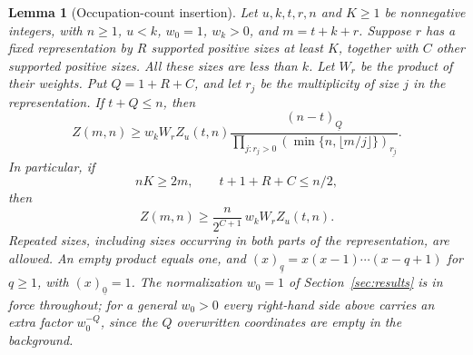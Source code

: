 \documentclass[11pt]{amsart}
\newtheorem{lemma}[theorem]{Lemma}
\theoremstyle{remark}\newtheorem{remark}[theorem]{Remark}
\newcommand{\fall}[2]{(#1)_{\underline{#2}}}
\begin{document}
\begin{lemma}[Occupation-count insertion]\label{lem:insertion}
Let $u,k,t,r,n$ and $K\ge1$ be nonnegative integers, with $n\ge1$, $u<k$,
$w_0=1$, $w_k>0$, and $m=t+k+r$. Suppose $r$ has a fixed representation
by $R$ supported positive sizes at least $K$, together with $C$ other
supported positive sizes. All these sizes are less than $k$. Let $W_r$ be
the product of their weights. Put $Q=1+R+C$, and let $r_j$ be the
multiplicity of size $j$ in the representation. If $t+Q\le n$, then
\begin{equation}\label{eq:sharpinsertion}
 Z(m,n)\ge w_kW_r Z_u(t,n)
 \frac{\fall{n-t}{Q}}
 {\displaystyle\prod_{j:r_j>0}\fall{\min\{n,\lfloor m/j\rfloor\}}{r_j}}.
\end{equation}
In particular, if
\begin{equation}\label{eq:insertionconditions}
 nK\ge2m,\qquad t+1+R+C\le n/2,
\end{equation}
then
\begin{equation}\label{eq:insertion}
 Z(m,n)\ge\frac{n}{2^{C+1}}\,w_k W_r Z_u(t,n).
\end{equation}
Repeated sizes, including sizes occurring in both parts of the
representation, are allowed. An empty product equals one, and
$(x)_{\underline q}=x(x-1)\cdots(x-q+1)$ for $q\ge1$, with
$(x)_{\underline0}=1$. The normalization $w_0=1$ of
Section~\ref{sec:results} is in force throughout; for a general $w_0>0$ every
right-hand side above carries an extra factor $w_0^{-Q}$, since the $Q$
overwritten coordinates are empty in the background.
\end{lemma}
\end{document}
